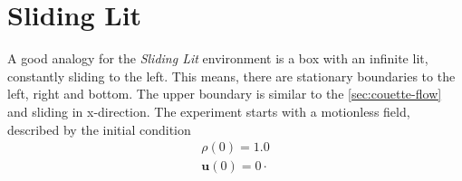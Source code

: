 \section{Sliding Lit}\label{sec:sliding-lit}
A good analogy for the \textit{Sliding Lit} environment is a box with an infinite lit, constantly sliding to the left.
This means, there are stationary boundaries to the left, right and bottom.
The upper boundary is similar to the \cref{sec:couette-flow} and sliding in x-direction.
The experiment starts with a motionless field, described by the initial condition
\begin{equation*}
    \begin{gathered}
        \rho(0) = 1.0 \\
        \mathbf{u}(0) = 0 \cdot
    \end{gathered}
\end{equation*}

